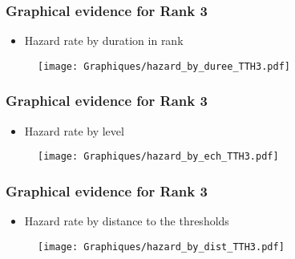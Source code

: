 \documentclass[xcolor=table,ignorenonframetext,12pt]{beamer}
\begin{document}
\begin{frame}
\frametitle{Graphical evidence for Rank 3}
\begin{itemize}
	\item Hazard rate by duration in rank
\end{itemize}
\vspace{-0.2cm}
\begin{center}
\begin{figure}
\texttt{[image: Graphiques/hazard\_by\_duree\_TTH3.pdf]}
\end{figure}
\end{center}
\end{frame}

\begin{frame}
\frametitle{Graphical evidence for Rank 3}
\begin{itemize}
	\item Hazard rate by level
\end{itemize}
\vspace{-0.2cm}
\begin{center}
\begin{figure}
\texttt{[image: Graphiques/hazard\_by\_ech\_TTH3.pdf]}
\end{figure}
\end{center}

\end{frame}
\begin{frame}
\frametitle{Graphical evidence for Rank 3}
\begin{itemize}
	\item Hazard rate by distance to the thresholds
\end{itemize}
\vspace{-0.2cm}
\begin{center}
\begin{figure}
\texttt{[image: Graphiques/hazard\_by\_dist\_TTH3.pdf]}
\end{figure}
\end{center}

\end{frame}
\end{document}
